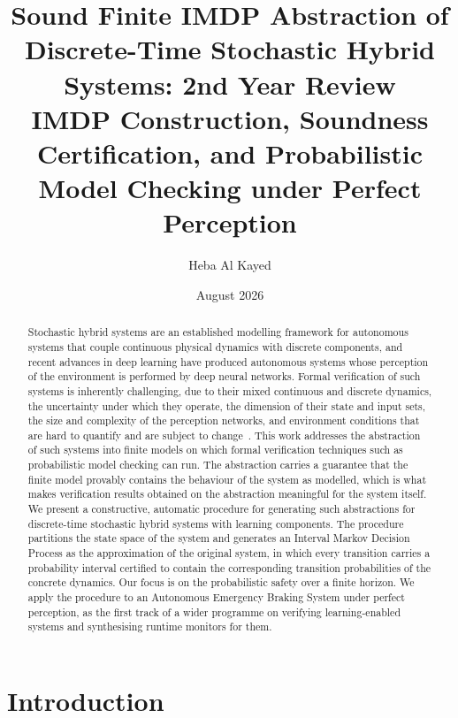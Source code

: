 \documentclass[11pt,a4paper]{article}
\title{Sound Finite IMDP Abstraction of Discrete-Time Stochastic Hybrid Systems: 2nd Year Review\\
	\small IMDP Construction, Soundness Certification, and Probabilistic Model Checking under Perfect Perception}
\author{Heba Al Kayed}
\affil{Institute for Perception, Action and Behaviour (IPAB), School of Informatics, University of Edinburgh}
\affil{\normalfont\small Supervisors: Dr Craig Innes and Dr Elizabeth Polgreen}
\date{\normalfont\small August 2026}
\theoremstyle{plain}
\theoremstyle{remark}
\begin{document}
	\maketitle
	
	\begin{abstract}
		Stochastic hybrid systems are an established modelling framework for autonomous systems that couple continuous physical dynamics with discrete components, and recent advances in deep learning have produced autonomous systems whose perception of the environment is performed by deep neural networks. Formal verification of such systems is inherently challenging, due to their mixed continuous and discrete dynamics, the uncertainty under which they operate, the dimension of their state and input sets, the size and complexity of the perception networks, and environment conditions that are hard to quantify and are subject to change~\cite{LSAZ22}. This work addresses the abstraction of such systems into finite models on which formal verification techniques such as probabilistic model checking can run. The abstraction carries a guarantee that the finite model provably contains the behaviour of the system as modelled, which is what makes verification results obtained on the abstraction meaningful for the system itself. We present a constructive, automatic procedure for generating such abstractions for discrete-time stochastic hybrid systems with learning components. The procedure partitions the state space of the system and generates an Interval Markov Decision Process as the approximation of the original system, in which every transition carries a probability interval certified to contain the corresponding transition probabilities of the concrete dynamics. Our focus is on the probabilistic safety over a finite horizon. We apply the procedure to an Autonomous Emergency Braking System under perfect perception, as the first track of a wider programme on verifying learning-enabled systems and synthesising runtime monitors for them.
	\end{abstract}
	
	\tableofcontents %
	
	\bigskip
	
	\section{Introduction}
	\label{sec:intro}
	
\end{document}
